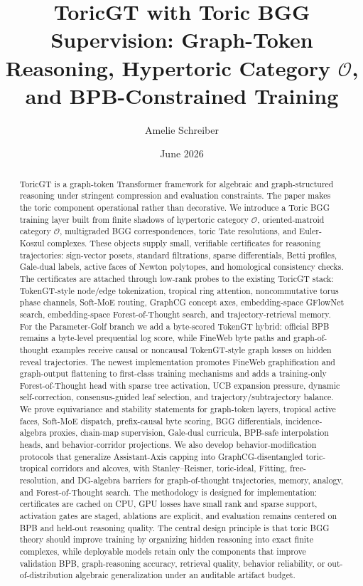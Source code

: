 \documentclass[11pt]{article}
\title{\vspace{-2em}ToricGT with Toric BGG Supervision: Graph-Token Reasoning, Hypertoric Category $\mathcal O$, and BPB-Constrained Training}
\author{Amelie Schreiber}
\date{June 2026}
\theoremstyle{definition}
\theoremstyle{plain}
\theoremstyle{remark}
\numberwithin{equation}{section}
\begin{document}
\maketitle


\begin{abstract}
ToricGT is a graph-token Transformer framework for algebraic and graph-structured reasoning under stringent compression and evaluation constraints.  The paper makes the toric component operational rather than decorative.  We introduce a Toric BGG training layer built from finite shadows of hypertoric category $\mathcal O$, oriented-matroid category $\mathcal O$, multigraded BGG correspondences, toric Tate resolutions, and Euler-Koszul complexes.  These objects supply small, verifiable certificates for reasoning trajectories: sign-vector posets, standard filtrations, sparse differentials, Betti profiles, Gale-dual labels, active faces of Newton polytopes, and homological consistency checks.  The certificates are attached through low-rank probes to the existing ToricGT stack: TokenGT-style node/edge tokenization, tropical ring attention, noncommutative torus phase channels, Soft-MoE routing, GraphCG concept axes, embedding-space GFlowNet search, embedding-space Forest-of-Thought search, and trajectory-retrieval memory.  For the Parameter-Golf branch we add a byte-scored TokenGT hybrid: official BPB remains a byte-level prequential log score, while FineWeb byte paths and graph-of-thought examples receive causal or noncausal TokenGT-style graph losses on hidden reveal trajectories.  The newest implementation promotes FineWeb graphification and graph-output flattening to first-class training mechanisms and adds a training-only Forest-of-Thought head with sparse tree activation, UCB expansion pressure, dynamic self-correction, consensus-guided leaf selection, and trajectory/subtrajectory balance.  We prove equivariance and stability statements for graph-token layers, tropical active faces, Soft-MoE dispatch, prefix-causal byte scoring, BGG differentials, incidence-algebra proxies, chain-map supervision, Gale-dual curricula, BPB-safe interpolation heads, and behavior-corridor projections.  We also develop behavior-modification protocols that generalize Assistant-Axis capping into GraphCG-disentangled toric-tropical corridors and alcoves, with Stanley--Reisner, toric-ideal, Fitting, free-resolution, and DG-algebra barriers for graph-of-thought trajectories, memory, analogy, and Forest-of-Thought search.  The methodology is designed for implementation: certificates are cached on CPU, GPU losses have small rank and sparse support, activation gates are staged, ablations are explicit, and evaluation remains centered on BPB and held-out reasoning quality.  The central design principle is that toric BGG theory should improve training by organizing hidden reasoning into exact finite complexes, while deployable models retain only the components that improve validation BPB, graph-reasoning accuracy, retrieval quality, behavior reliability, or out-of-distribution algebraic generalization under an auditable artifact budget.
\end{abstract}
\end{document}
